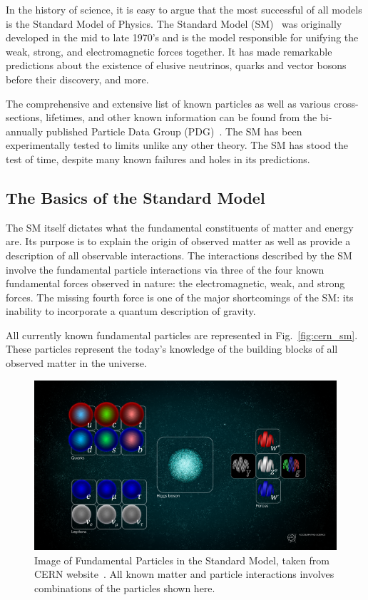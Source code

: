 In the history of science, it is easy to argue that the most successful of all models is the Standard Model of Physics.
The Standard Model (SM)~\citep{GLASHOW1961579, salam1964electromagnetic, weinberg1967model} was originally developed in the mid to late 1970's and is the model responsible for unifying the weak, strong, and electromagnetic forces together.
It has made remarkable predictions about the existence of elusive neutrinos, quarks and vector bosons before their discovery, and more.

The comprehensive and extensive list of known particles as well as various cross-sections, lifetimes, and other known information can be found from the bi-annually published Particle Data Group (PDG)~\citep{Workman:2022ynf}.
The SM has been experimentally tested to limits unlike any other theory.
The SM has stood the test of time, despite many known failures and holes in its predictions.

\subsection{The Basics of the Standard Model}

The SM itself dictates what the fundamental constituents of matter and energy are.
Its purpose is to explain the origin of observed matter as well as provide a description of all observable interactions.
The interactions described by the SM involve the fundamental particle interactions via three of the four known fundamental forces observed in nature: the electromagnetic, weak, and strong forces.
The missing fourth force is one of the major shortcomings of the SM: its inability to incorporate a quantum description of gravity.

All currently known fundamental particles are represented in Fig.~\ref{fig:cern_sm}.
These particles represent the today's knowledge of the building blocks of all observed matter in the universe.

\begin{figure}[]
\centering
\includegraphics[width=\textwidth]{images/STDM_higgs_and_field_D.png}
\caption{Image of Fundamental Particles in the Standard Model, taken from CERN website~\citep{dominguez_2015}.
  All known matter and particle interactions involves combinations of the particles shown here.}
\end{figure}
~\label{fig:cern_sm}

